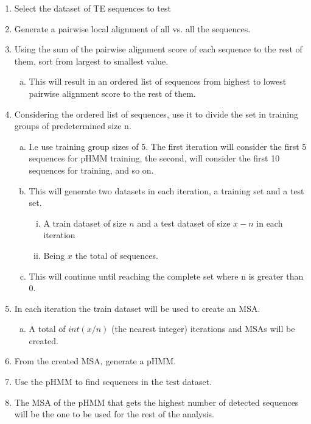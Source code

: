 \documentclass[unnumsec,webpdf,contemporary,large]{oup-authoring-template}%
\theoremstyle{thmstyleone}%
\theoremstyle{thmstyletwo}%
\theoremstyle{thmstylethree}%
\begin{document}
\begin{enumerate}[1.]
\item Select the dataset of  TE sequences to test
\item Generate a pairwise local alignment of all vs. all the sequences. 
\item Using the sum of the pairwise alignment score of each sequence to the rest of them, sort from largest to smallest value.
\begin{enumerate}[(a)]
    \item This will result in an ordered list of sequences from highest to lowest pairwise alignment score to the rest of them.
\end{enumerate}
\item Considering the ordered list of sequences, use it to divide the set in training groups of predetermined size n.

\begin{enumerate}[(a)]
    \item I.e use training group sizes of 5. The first iteration will consider the first 5 sequences for pHMM training, the second, will consider the first 10 sequences for training, and so on.
    \item This will generate two datasets in each iteration, a training set and a test set.
        \begin{enumerate}[(ii)]
            \item A train dataset of size $n$ and a test dataset of size $x-n$ in each iteration
            \item Being $x$ the total of sequences.
        \end{enumerate}
    \item This will continue until reaching the complete set where n is greater than 0.
\end{enumerate}

\item In each iteration the train dataset will be used to create an MSA.
\begin{enumerate}[(a)]
    \item A total of $int(x/n)$ (the nearest integer) iterations and MSAs will be created.
\end{enumerate}
\item From the created MSA, generate a pHMM.
\item Use the pHMM to find sequences in the test dataset.
\item The MSA of the pHMM that gets the highest number of detected sequences will be the one to be used for the rest of the analysis.
\end{enumerate}
\end{document}
